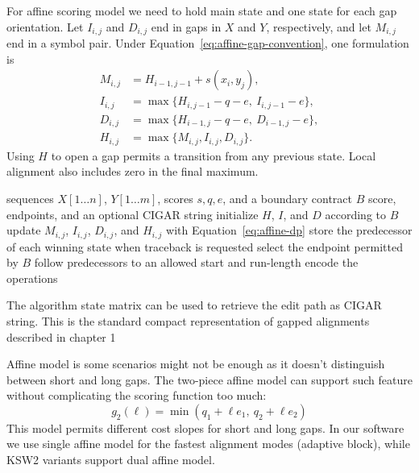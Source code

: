 For affine scoring model we need to hold main state and one state for each gap orientation.
Let \(I_{i,j}\) and \(D_{i,j}\) end in gaps in \(X\) and \(Y\), respectively,
and let \(M_{i,j}\) end in a symbol pair. Under
Equation~\ref{eq:affine-gap-convention}, one formulation is
\begin{equation}
\begin{aligned}
  M_{i,j} &= H_{i-1,j-1}+s(x_i,y_j),\\
  I_{i,j} &= \max\{H_{i,j-1}-q-e,\ I_{i,j-1}-e\},\\
  D_{i,j} &= \max\{H_{i-1,j}-q-e,\ D_{i-1,j}-e\},\\
  H_{i,j} &= \max\{M_{i,j},I_{i,j},D_{i,j}\}.
\end{aligned}
\label{eq:affine-dp}
\end{equation}
Using \(H\) to open a gap permits a transition from any previous state. Local
alignment also includes zero in the final maximum.

\begin{algorithm}[H]
  \caption{Affine-gap alignment with an explicit boundary contract}
  \label{alg:affine-dp}
  \begin{algorithmic}[1]
    \Require sequences \(X[1\ldots n]\), \(Y[1\ldots m]\), scores \(s,q,e\),
      and a boundary contract \(B\)
    \Ensure score, endpoints, and an optional CIGAR string
    \State initialize \(H\), \(I\), and \(D\) according to \(B\)
        \State update \(M_{i,j}\), \(I_{i,j}\), \(D_{i,j}\), and \(H_{i,j}\)
          with Equation~\ref{eq:affine-dp}
        \State store the predecessor of each winning state when traceback is
          requested
      \EndFor
    \EndFor
    \State select the endpoint permitted by \(B\)
    \State follow predecessors to an allowed start and run-length encode the
      operations
  \end{algorithmic}
\end{algorithm}

The algorithm state matrix can be used to retrieve the edit path as CIGAR string. This is
the standard compact representation of gapped alignments described in chapter 1\cite{sam_format_specification}

Affine model is some scenarios might not be enough as it doesn't distinguish between short and long gaps. The two-piece affine model can support such feature without complicating the scoring function too much:
\begin{equation}
  g_2(\ell)=\min(q_1+\ell e_1,\ q_2+\ell e_2)
\label{eq:two-piece-affine-model}
\end{equation}
This model permits different cost slopes for short and long gaps. In our software we use single affine model for the fastest alignment modes (adaptive block), while KSW2 variants support dual affine model.

